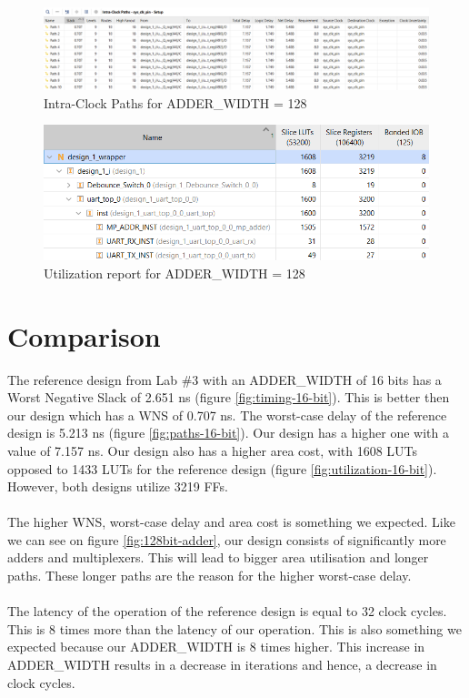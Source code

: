 \documentclass[a4paper,kul]{kulakarticle} %
\begin{document}
\begin{figure}[h]
	\centering
	\includegraphics[width=0.75\linewidth]{images/paths-128-bit.png}
	\caption{Intra-Clock Paths for ADDER\_WIDTH = 128}
	\label{fig:paths-128-bit}
\end{figure}

\begin{figure}[h]
	\centering
	\includegraphics[width=0.75\linewidth]{images/utilization-128-bit.png}
	\caption{Utilization report for ADDER\_WIDTH = 128}
	\label{fig:utilization-128-bit}
\end{figure}

\section{Comparison }


The reference design from Lab \#3 with an ADDER\_WIDTH of 16 bits has a Worst Negative Slack of 2.651 ns (figure \ref{fig:timing-16-bit}). This is better then our design which has a WNS of 0.707 ns. The worst-case delay of the reference design is 5.213 ns (figure \ref{fig:paths-16-bit}). Our design has a higher one with a value of 7.157 ns. Our design also has a higher area cost, with 1608 LUTs opposed to 1433 LUTs for the reference design (figure \ref{fig:utilization-16-bit}). However, both designs utilize 3219 FFs. 
\\\\
The higher WNS, worst-case delay and area cost is something we expected. Like we can see on figure \ref{fig:128bit-adder}, our design consists of significantly more adders and multiplexers. This will lead to bigger area utilisation and longer paths. These longer paths are the reason for the higher worst-case delay.
\\\\
The latency of the operation of the reference design is equal to 32 clock cycles. This is 8 times more than the latency of our operation. This is also something we expected because our ADDER\_WIDTH is 8 times higher. This increase in ADDER\_WIDTH results in a decrease in iterations and hence, a decrease in clock cycles.
\end{document}
